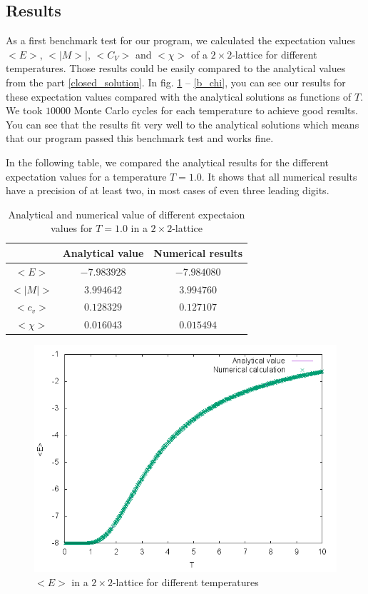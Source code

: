 \documentclass[10pt,a4paper]{article}
\begin{document}
\subsection{Results}
As a first benchmark test for our program, we calculated the expectation values $<E>$, $<|M>|$, $<C_V>$ and $<\chi>$ of a $2\times2$-lattice for different temperatures. Those results could be easily compared to the analytical values from the part \ref{closed_solution}. In fig. \ref{b_E} -- \ref{b_chi}, you can see our results for these expectation values compared with the analytical solutions as functions of $T$. We took $10000$ Monte Carlo cycles for each temperature to achieve good results. You can see that the results fit very well to the analytical solutions which means that our program passed this benchmark test and works fine.

In the following table, we compared the analytical results for the different expectation values for a temperature $T=1.0$. It shows that all numerical results have a precision of at least two, in most cases of even three leading digits.
\begin{table}[h]
	\centering
	\caption{Analytical and numerical value of different expectaion values for $T=1.0$ in a $2\times2$-lattice}
	\begin{tabular}{ccc}
	& Analytical value & Numerical results \\\hline
	$<E>$ & $-7.983928$ & $-7.984080$ \\
	$<|M|>$ & $3.994642$ & $3.994760$ \\
	$<c_v>$ & $0.128329$ & $0.127107$ \\
	$<\chi>$ & $0.016043$ & $0.015494$	
	\end{tabular}	
\end{table}
\begin{figure}[h]
	\includegraphics[width=\textwidth]{Energy.png}
	\caption{$<E>$ in a $2\times 2$-lattice for different temperatures\label{b_E}}
\end{figure}
\end{document}
